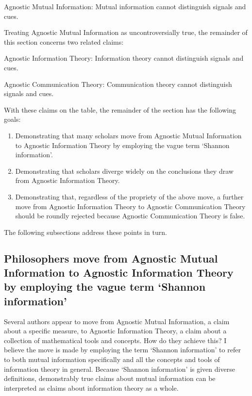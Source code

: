 \begin{myquote}
{\sc Agnostic Mutual Information}: Mutual information cannot distinguish signals and cues.
\end{myquote}

\noindent Treating {\sc Agnostic Mutual Information} as uncontroversially true, the remainder of this section concerns two related claims:

\begin{myquote}
{\sc Agnostic Information Theory}: Information theory cannot distinguish signals and cues.
\end{myquote}

\begin{myquote}
{\sc Agnostic Communication Theory}: Communication theory cannot distinguish signals and cues.
\end{myquote}

\noindent With these claims on the table, the remainder of the section has the following goals:

\begin{enumerate}
    \item Demonstrating that many scholars move from {\sc Agnostic Mutual Information} to {\sc Agnostic Information Theory} by employing the vague term `Shannon information'.
    \item Demonstrating that scholars diverge widely on the conclusions they draw from {\sc Agnostic Information Theory}.
    \item Demonstrating that, regardless of the propriety of the above move, a further move from {\sc Agnostic Information Theory} to {\sc Agnostic Communication Theory} should be roundly rejected because {\sc Agnostic Communication Theory} is false.
\end{enumerate}

\noindent The following subsections address these points in turn.

\subsection{\sloppy Philosophers move from {\sc Agnostic Mutual Information} to {\sc Agnostic Information Theory} by employing the vague term `Shannon information'}

Several authors appear to move from {\sc Agnostic Mutual Information}, a claim about a specific measure, to {\sc Agnostic Information Theory}, a claim about a collection of mathematical tools and concepts.
How do they achieve this?
I believe the move is made by employing the term `Shannon information' to refer to both mutual information specifically and all the concepts and tools of information theory in general.
Because `Shannon information' is given diverse definitions, demonstrably true claims about mutual information can be interpreted as claims about information theory as a whole.

